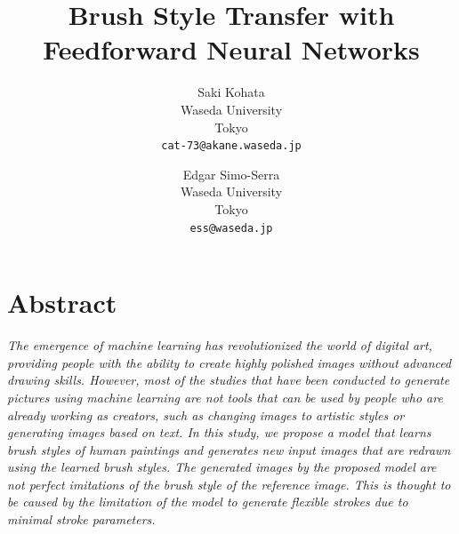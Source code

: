 \documentclass{mva_style}
\begin{document}
\title{Brush Style Transfer with Feedforward Neural Networks}

\author{
  Saki Kohata\\
  Waseda University\\
  Tokyo\\
  {\tt cat-73@akane.waseda.jp}\\
  \and
  Edgar Simo-Serra\\
  Waseda University\\
  Tokyo\\
  {\tt ess@waseda.jp}\\
}

\maketitle

\section*{\centering Abstract}
\textit{
  The emergence of machine learning has revolutionized the world of digital 
  art, providing people with the ability to create highly polished images 
  without advanced drawing skills. 
  However, most of the studies that have been conducted to generate pictures 
  using machine learning are not tools that can be used by people who are 
  already working as creators, such as changing images to artistic styles or 
  generating images based on text. In this study, we propose a model that 
  learns brush styles of human paintings and generates new input images that 
  are redrawn using the learned brush styles. 
  The generated images by the proposed model are not perfect imitations of 
  the brush style of the reference image. This is thought to be caused by 
  the limitation of the model to generate flexible strokes due to minimal 
  stroke parameters.
}
\end{document}

